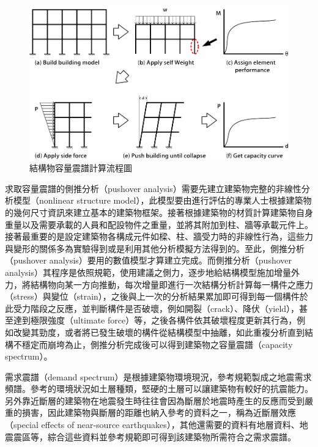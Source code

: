 \begin{figure}[hbtp]
  \begin{center}
    \includegraphics[width=1.0\textwidth]{figures/capacity-curve.png}
    \caption{結構物容量震譜計算流程圖}
    \label{fig:capacity-curve}
  \end{center}
\end{figure}

求取容量震譜的側推分析（pushover analysis）需要先建立建築物完整的非線性分析模型（nonlinear structure model），此模型要由進行評估的專業人士根據建築物的幾何尺寸資訊來建立基本的建築物框架。接著根據建築物的材質計算建築物自身重量以及需要承載的人員和配設物件之重量，並將其附加到柱、牆等承載元件上。接著最重要的是設定建築物各構成元件如樑、柱、牆受力時的非線性行為，這些力與變形的關係多為實驗得到或是利用其他分析模擬方法得到的。至此，側推分析（pushover analysis）要用的數值模型才算建立完成。而側推分析（pushover analysis）其程序是依照規範，使用建議之側力，逐步地給結構模型施加增量外力，將結構物向某一方向推動，每次增量即進行一次結構分析計算每一構件之應力（stress）與變位（strain），之後與上一次的分析結果累加即可得到每一個構件於此受力階段之反應，並判斷構件是否破壞，例如開裂（crack）、降伏（yield），甚至達到極限強度（ultimate force）等，之後各構件依其破壞程度更新其行為，例如改變其勁度，或者將已發生破壞的構件從結構模型中抽離，如此重複分析直到結構不穩定而崩垮為止，側推分析完成後可以得到建築物之容量震譜（capacity spectrum）。

需求震譜（demand spectrum）是根據建築物環境現況，參考規範製成之地震需求頻譜。參考的環境狀況如土層種類，堅硬的土層可以讓建築物有較好的抗震能力。另外靠近斷層的建築物在地震發生時往往會因為斷層於地震時產生的反應而受到嚴重的損害，因此建築物與斷層的距離也納入參考的資料之一，稱為近斷層效應（special effects of near-source earthquakes），其他還需要的資料有地層資料、地震震區等，綜合這些資料並參考規範即可得到該建築物所需符合之需求震譜。

